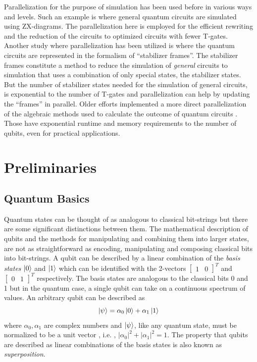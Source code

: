 \documentclass[runningheads]{llncs}
\begin{document}
Parallelization for the purpose of simulation has been used before in various ways and levels. Such an example is \cite{zx_fast_sim} where general quantum circuits are simulated using ZX-diagrams. The parallelization here is employed for the efficient rewriting and the reduction of the circuits to optimized circuits with fewer T-gates. Another study where parallelization has been utilized is \cite{Garcia_stab_frames} where the quantum circuits are represented in the formalism of ``stabilizer frames''. The stabilizer frames constitute a method to reduce the simulation of \textit{general} circuits to simulation that uses a combination of only special states, the stabilizer states. But the number of stabilizer states needed for the simulation of general circuits, is exponential to the number of T-gates and parallelization can help by updating the ``frames'' in parallel. Older efforts implemented a more direct parallelization of the algebraic methods used to calculate the outcome of quantum circuits \cite{Obenland:1997tb,DERAEDT201947}. Those have exponential runtime and memory requirements to the number of qubits, even for practical applications.


\section{Preliminaries}\label{sec:prelim}


\subsection{Quantum Basics}\label{sec:basic}

Quantum states can be thought of as analogous to classical bit-strings but there are some significant distinctions between them. The mathematical description of qubits and the methods for manipulating and combining them into larger states, are not as straightforward as encoding, manipulating and composing classical bits into bit-strings.
A qubit can be described by a linear combination of the \textit{basis states} $\ket{0}$ and $\ket{1}$ which can be identified with the 2-vectors $\begin{bmatrix} 1 & 0 \end{bmatrix}^T$ and $\begin{bmatrix} 0 & 1 \end{bmatrix}^T$ respectively. The basis states are analogous to the classical bits 0 and 1 but in the quantum case, a single qubit can take on a continuous spectrum of values. An arbitrary qubit can be described as 
\begin{equation} \ket{\psi}= \alpha_0 \ket{0} + \alpha_1 \ket{1} 
\end{equation} where $\alpha_0, \alpha_1$ are complex numbers and $\ket{\psi}$, like any quantum state, must be normalized to be a unit vector , i.e. , $|\alpha_0|^2 + |\alpha_1|^2 = 1$. The property that qubits are described as linear combinations of the basis states is also known as \textit{superposition}.
\end{document}
